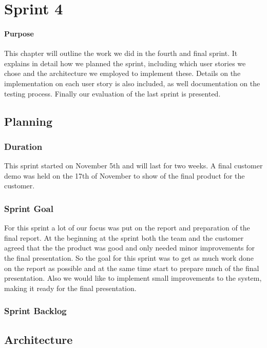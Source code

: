 \chapter{Sprint 4}

\minitoc

\subsubsection{Purpose}

This chapter will outline the work we did in the fourth and final sprint. It explains in detail how we planned the sprint, including which user stories we chose and the architecture we employed to implement these. Details on the implementation on each user story is also included, as well documentation on the testing process. Finally our evaluation of the last sprint is presented.

\clearpage


\section{Planning}

\subsection{Duration}
This sprint started on November 5th and will last for two weeks. A final customer demo was held on the 17th of November to show of the final product for the customer.

\subsection{Sprint Goal}
For this sprint a lot of our focus was put on the report and preparation of the final report. At the beginning at the sprint both the team and the customer agreed that the the product was good and only needed minor improvements for the final presentation. So the goal for this sprint was to get as much work done on the report as possible and at the same time start to prepare much of the final presentation. Also we would like to implement small improvements to the system, making it ready for the final presentation.


\subsection{Sprint Backlog}

\section{Architecture}
